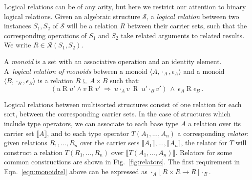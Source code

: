 \documentclass[acmsmall,authordraft]{acmart}
\newcommand{\ifr}[1]{\mathrel{[{#1}]}}
\begin{document}

Logical relations can be of any arity,
but here
we restrict our attention to
binary logical relations.
Given an algebraic structure $\mathcal{S}$,
a \emph{logical relation}
between two instances $S_1, S_2$ of $\mathcal{S}$
will be a relation $R$
between their carrier sets,
such that the corresponding operations of $S_1$ and $S_2$
take related arguments to related results.
We write $R \in \mathcal{R}(S_1, S_2)$.

\begin{example}
\label{ex:monoid}
A \emph{monoid} is a set with
an associative operation and
an identity element.
A~\emph{logical relation of monoids} between
a monoid $\langle A, \cdot_A, \epsilon_A \rangle$ and
a monoid $\langle B, \cdot_B, \epsilon_B \rangle$
is a relation $R \subseteq A \times B$
such that:
\begin{equation}
\label{eqn:monoidrel}
(u \mathrel{R} u' \wedge v \mathrel{R} v' \: \Rightarrow \:
 u \cdot_A v \: \mathrel{R} \: u' \cdot_B v')
\: \wedge \:
\epsilon_A \mathrel{R} \epsilon_B \,.
\end{equation}
\end{example}

Logical relations between multisorted structures
consist of one relation for each sort,
between the corresponding carrier sets.
In the case of structures which include type operators,
we can associate to each base type $A$
a relation over its carrier set $\llbracket A \rrbracket$,
and to each type operator $T(A_1, \ldots, A_n)$
a corresponding \emph{relator}:
given relations $R_1, \ldots, R_n$ over
the carrier sets $\llbracket A_1 \rrbracket, \ldots, \llbracket A_n \rrbracket$,
the relator for $T$
will construct a relation $T(R_1, \ldots, R_n)$
over $\llbracket T(A_1, \ldots, A_n) \rrbracket$.
Relators for some common constructions are shown in Fig.~\ref{fig:relators}.
The first requirement in Eqn.~\ref{eqn:monoidrel} above
can be expressed as
$
  \cdot_A \ifr{R \times R \rightarrow R} \cdot_B
$.
\end{document}
